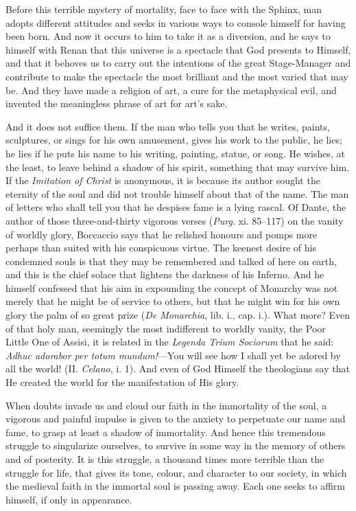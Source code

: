 Before this terrible mystery of mortality, face to face with the
Sphinx, man adopts different attitudes and seeks in various ways to
console himself for having been born. And now it occurs to him to take
it as a diversion, and he says to himself with Renan that this
universe is a spectacle that God presents to Himself, and that it
behoves us to carry out the intentions of the great Stage-Manager and
contribute to make the spectacle the most brilliant and the most
varied that may be. And they have made a religion of art, a cure for
the metaphysical evil, and invented the meaningless phrase of art for
art's sake.

And it does not suffice them. If the man who tells you that he writes,
paints, sculptures, or sings for his own amusement, gives his work to
the public, he lies; he lies if he puts his name to his writing,
painting, statue, or song. He wishes, at the least, to leave behind a
shadow of his spirit, something that may survive him. If the
\textit{Imitation of Christ} is anonymous, it is because its author
sought the eternity of the soul and did not trouble himself about that
of the name. The man of letters who shall tell you that he despises
fame is a lying rascal.  Of Dante, the author of those
three-and-thirty vigorous verses (\textit{Purg}. xi. 85--117) on the
vanity of worldly glory, Boccaccio says that he relished honours and
pomps more perhaps than suited with his conspicuous virtue. The
keenest desire of his condemned souls is that they may be remembered
and talked of here on earth, and this is the chief solace that
lightens the darkness of his Inferno. And he himself confessed that
his aim in expounding the concept of Monarchy was not merely that he
might be of service to others, but that he might win for his own glory
the palm of so great prize (\textit{De Monarchia}, lib. i., cap. i.).
What more? Even of that holy man, seemingly the most indifferent to
worldly vanity, the Poor Little One of Assisi, it is related in the
\textit{Legenda Trium Sociorum} that he said: \textit{Adhuc adorabor
per totum mundum!}---You will see how I shall yet be adored by all the
world! (II. \textit{Celano}, i. 1). And even of God Himself the
theologians say that He created the world for the manifestation of His
glory.

When doubts invade us and cloud our faith in the immortality of the
soul, a vigorous and painful impulse is given to the anxiety to
perpetuate our name and fame, to grasp at least a shadow of
immortality. And hence this tremendous struggle to singularize
ourselves, to survive in some way in the memory of others and of
posterity. It is this struggle, a thousand times more terrible than
the struggle for life, that gives its tone, colour, and character to
our society, in which the medieval faith in the immortal soul is
passing away. Each one seeks to affirm himself, if only in appearance.

